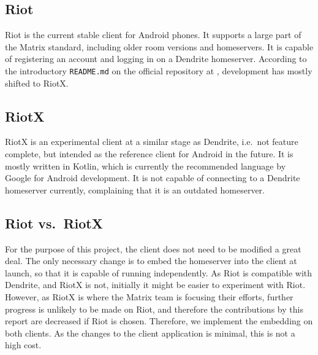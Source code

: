 \subsection{Riot}
Riot is the current stable client for Android phones.
It supports a large part of the Matrix standard, including older room versions and homeservers.
It is capable of registering an account and logging in on a Dendrite homeserver.
According to the introductory \texttt{README.md} on the official repository at , development has mostly shifted to RiotX.

\subsection{RiotX}
RiotX is an experimental client at a similar stage as Dendrite, i.e.~not feature complete, but intended as the reference client for Android in the future.
It is mostly written in Kotlin, which is currently the recommended language by Google for Android development.
It is not capable of connecting to a Dendrite homeserver currently, complaining that it is an outdated homeserver.

\subsection{Riot vs.~RiotX}
For the purpose of this project, the client does not need to be modified a great deal.
The only necessary change is to embed the homeserver into the client at launch, so that it is capable of running independently.
As Riot is compatible with Dendrite, and RiotX is not, initially it might be easier to experiment with Riot.
However, as RiotX is where the Matrix team is focusing their efforts, further progress is unlikely to be made on Riot, and therefore the contributions by this report are decreased if Riot is chosen.
Therefore, we implement the embedding on both clients.
As the changes to the client application is minimal, this is not a high cost.


